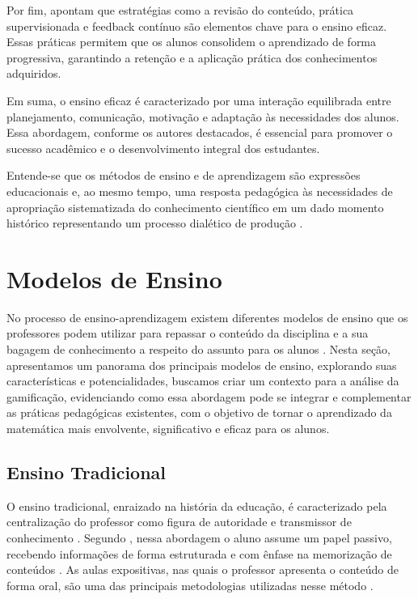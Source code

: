 Por fim, \cite{RosenshineStevens1986} apontam que estratégias como a revisão do conteúdo, prática supervisionada e feedback contínuo são elementos chave para o ensino eficaz. Essas práticas permitem que os alunos consolidem o aprendizado de forma progressiva, garantindo a retenção e a aplicação prática dos conhecimentos adquiridos.

Em suma, o ensino eficaz é caracterizado por uma interação equilibrada entre planejamento, comunicação, motivação e adaptação às necessidades dos alunos. Essa abordagem, conforme os autores destacados, é essencial para promover o sucesso acadêmico e o desenvolvimento integral dos estudantes.

Entende-se que os métodos de ensino e de aprendizagem são expressões educacionais e, ao mesmo tempo, uma resposta pedagógica às necessidades de apropriação sistematizada do conhecimento científico em um dado momento histórico representando um processo dialético de produção \cite{lacanallo2007metodos}.

\section{Modelos de Ensino}
No processo de ensino-aprendizagem existem diferentes modelos de ensino que os professores podem utilizar para repassar o conteúdo da disciplina e a sua bagagem de conhecimento a respeito do assunto para os alunos \cite{kruger2013metodo}. Nesta seção, apresentamos um panorama dos principais modelos de ensino, explorando suas características e potencialidades, buscamos criar um contexto para a análise da gamificação, evidenciando como essa abordagem pode se integrar e complementar as práticas pedagógicas existentes, com o objetivo de tornar o aprendizado da matemática mais envolvente, significativo e eficaz para os alunos.

\subsection{Ensino Tradicional}

O ensino tradicional, enraizado na história da educação, é caracterizado pela centralização do professor como figura de autoridade e transmissor de conhecimento \cite{kruger2013metodo}. Segundo \cite{mezzari2011}, nessa abordagem o aluno assume um papel passivo, recebendo informações de forma estruturada e com ênfase na memorização de conteúdos . As aulas expositivas, nas quais o professor apresenta o conteúdo de forma oral, são uma das principais metodologias utilizadas nesse método \cite{weintraub2011}.

